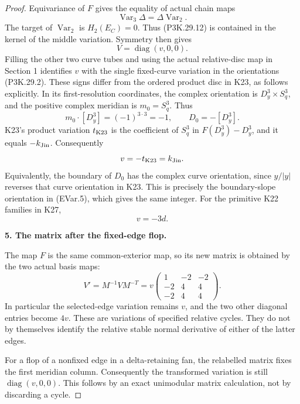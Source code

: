 \begin{proof}
Equivariance of \(F\) gives the equality of actual chain
maps
\[
             \operatorname{Var}_3\Delta
                         =\Delta\operatorname{Var}_2.
                                                        \tag{P3K.29.13}
\]
The target of \(\operatorname{Var}_2\) is \(H_2(E_C)=0\).
Thus (P3K.29.12) is contained in the kernel of the middle
variation. Symmetry then gives
\[
                       V=\operatorname{diag}(v,0,0).
                                                        \tag{P3K.29.14}
\]
Filling the other two curve tubes and using the actual
relative-disc map in Section 1 identifies \(v\) with the
single fixed-curve variation in the orientations
(P3K.29.2). These signs differ from the ordered product
disc in K23, as follows explicitly. In its first-resolution
coordinates, the complex orientation is
\(D^3_y\times S^3_q\), and the positive complex meridian
is \(m_0=S^3_q\). Thus
\[
      m_0\cdot[D^3_y]=(-1)^{3\cdot3}=-1,\qquad
      D_0=-[D^3_y].
\]
K23's product variation \(t_{\rm K23}\) is the coefficient
of \(S^3_q\) in \(F(D^3_y)-D^3_y\), and it equals
\(-k_{\rm Jin}\). Consequently
\[
                v=-t_{\rm K23}=k_{\rm Jin}.
\]
Equivalently, the boundary of \(D_0\) has the complex
curve orientation, since \(y/|y|\) reverses that curve
orientation in K23. This is precisely the boundary-slope
orientation in (EVar.5), which gives the same integer.
For the primitive K22 families in K27,
\[
                              v=-3d.
                                                        \tag{P3K.29.15}
\]

\par\medskip\noindent\textbf{5. The matrix after the fixed-edge flop.}\enspace

The map \(F\) is the same common-exterior map, so its new
matrix is obtained by the two actual basis maps:
\[
 V'=M^{-1}VM^{-T}
   =v\begin{pmatrix}
       1&-2&-2\\
       -2&4&4\\
       -2&4&4
      \end{pmatrix}.                                   \tag{P3K.29.16}
\]
In particular the selected-edge variation remains \(v\),
and the two other diagonal entries become \(4v\).
These are variations of specified relative cycles.
They do not by themselves identify the relative stable
normal derivative of either of the latter edges.

For a flop of a nonfixed edge in a delta-retaining fan,
the relabelled matrix fixes the first meridian column.
Consequently the transformed variation is still
\(\operatorname{diag}(v,0,0)\). This follows by an exact
unimodular matrix calculation, not by discarding a cycle.


\end{proof}
